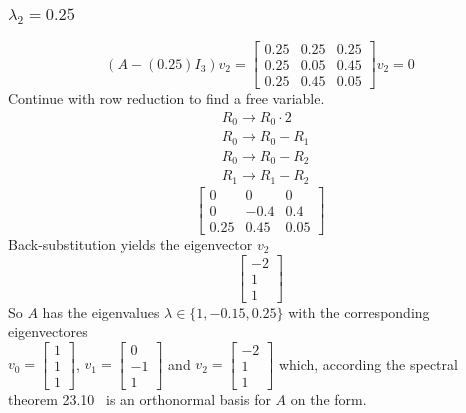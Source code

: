 \documentclass[12pt]{article}
\begin{document}
\subsubsection*{$\lambda_2 = 0.25$}
\begin{equation*}
    (A-(0.25)I_3)v_2 =
    \begin{bmatrix}
        0.25 & 0.25 & 0.25 \\
        0.25 & 0.05 & 0.45 \\
        0.25 & 0.45 & 0.05 
    \end{bmatrix}v_2 = 0
\end{equation*}
Continue with row reduction to find a free variable.
\begin{align*}
    &R_0 \to R_0 \cdot 2\\
    &R_0 \to R_0 - R_1\\
    &R_0 \to R_0 - R_2 \\
    &R_1 \to R_1 - R_2
\end{align*}
\begin{equation*}
    \begin{bmatrix}
       0 & 0 & 0 \\
       0 & -0.4 & 0.4 \\
       0.25 & 0.45 & 0.05
    \end{bmatrix}
\end{equation*}
Back-substitution yields the eigenvector $v_2$
\begin{equation*}
    \begin{bmatrix}
        -2 \\
        1  \\
        1
    \end{bmatrix}
\end{equation*}
So $A$ has  the eigenvalues $\lambda \in \{1, -0.15, 0.25\}$ with the corresponding eigenvectores\\ $v_0 = \begin{bmatrix}
    1\\
    1 \\
    1
\end{bmatrix}$, $v_1 = \begin{bmatrix}
    0 \\
    -1 \\
    1
\end{bmatrix}$ and $ v_2 = \begin{bmatrix}
    -2 \\
    1 \\
    1
\end{bmatrix}$  which, according the spectral theorem 23.10~\cite{NUMLA} is an orthonormal basis for $A$ on the form.
\end{document}
